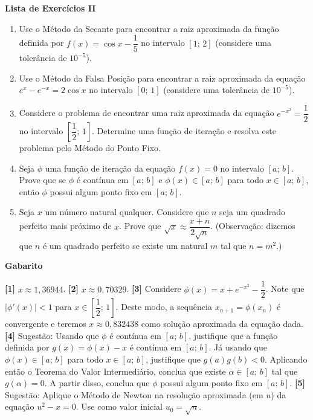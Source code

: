 \documentclass[12pt,a4paper]{article}
\begin{document}
\begin{center}
 \textbf{Lista de Exercícios II}
\end{center}

\begin{enumerate}
 \item Use o Método da Secante para encontrar a raiz aproximada da função definida por $f(x) = \cos x - \dfrac{1}{5}$ no intervalo $[1;\,2]$ (considere uma tolerância de $10^{-5}$).
 \item Use o Método da Falsa Posição para encontrar a raiz aproximada da equação $e^{x} - e^{-x} = 2\cos x$ no intervalo $[0;\,1]$ (considere uma tolerância de $10^{-5}$).
 \item Considere o problema de encontrar uma raiz aproximada da equação $e^{-x^2} = \dfrac{1}{2}$ no intervalo $\left[\dfrac{1}{2};\,1\right]$. Determine uma função de iteração e resolva este problema pelo Método do Ponto Fixo.
 \item Seja $\phi$ uma função de iteração da equação $f(x) = 0$ no intervalo $[a;\, b]$. Prove que se $\phi$ é contínua em $[a;\,b]$ e $\phi(x)\in[a;\,b]$ para 
 todo $x\in[a;\, b]$, então $\phi$ possui algum ponto fixo em $[a;\,b]$.
 \item Seja $x$ um número natural qualquer. Considere que $n$ seja um quadrado perfeito mais próximo de $x$. Prove que $\sqrt{x}\approx \dfrac{x+n}{2\sqrt{n}}$. 
 (Observação: dizemos que $n$ é um quadrado perfeito se existe um natural $m$ tal que $n = m^2$.)

\end{enumerate}

\begin{center}
\textbf{Gabarito}
\end{center}
\textbf{[1]} $x\approx 1,36944$. 
\textbf{[2]} $x\approx 0,70329$.
\textbf{[3]} Considere $\phi(x) = x + e^{-x^2} - \dfrac{1}{2}$. Note que $|\phi'(x)| < 1$ para $x\in\left[\dfrac{1}{2};\,1\right]$. Deste modo, a sequência 
$x_{n+1}=\phi(x_n)$ é convergente e teremos $x\approx 0,832438$ como solução aproximada da equação dada.
\textbf{[4]} Sugestão: Usando que $\phi$ é contínua em $[a;\,b]$, justifique que a função definida por $g(x) = \phi(x) - x$ é contínua em $[a;\,b]$. Já usando que $\phi(x)\in[a;\,b]$ para todo $x\in[a;\,b]$, justifique que $g(a)g(b) < 0$. 
Aplicando então o Teorema do Valor Intermediário, conclua que existe $\alpha\in[a;\,b]$ tal que $g(\alpha)=0$. A partir disso, conclua que $\phi$ possui algum ponto fixo em $[a;\,b]$. 
\textbf{[5]} Sugestão: Aplique o Método de Newton na resolução aproximada (em $u$) da equação $u^2 - x = 0$. Use como valor inicial $u_0 = \sqrt{n}$.
\end{document}
